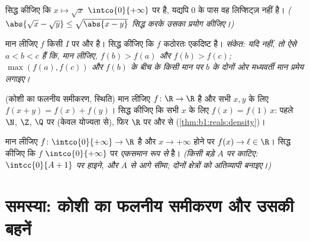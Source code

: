 \begin{exercise}[$\star\star$]\label{exo:b1:continuity:9}
सिद्ध कीजिए कि $x \mapsto \sqrt x$ $\intco{0}{+\infty}$ पर  है, यद्यपि $0$ के पास वह लिप्शिट्ज़ नहीं है। \emph{($\abs{\sqrt x -
\sqrt y} \leq \sqrt{\abs{x - y}}$ सिद्ध करके उसका प्रयोग कीजिए।)}
\end{exercise}

\begin{exercise}[$\star\star\star$]\label{exo:b1:continuity:10}
मान लीजिए $f$ किसी  $I$ पर  और  है। सिद्ध कीजिए कि $f$ कठोरतः
एकदिष्ट है। \emph{संकेत: यदि नहीं, तो ऐसे $a < b < c$ हैं कि, मान लीजिए,
$f(b) > f(a)$ और $f(b) > f(c)$; $\max(f(a), f(c))$ और $f(b)$ के बीच के किसी
मान पर $b$ के दोनों ओर मध्यवर्ती मान प्रमेय लगाइए।}
\end{exercise}

\begin{exercise}[$\star\star\star$]\label{exo:b1:continuity:11}
(कोशी का फलनीय समीकरण,  स्थिति) मान लीजिए $f \colon \R \to \R$  है
और सभी $x, y$ के लिए $f(x + y) = f(x) + f(y)$। सिद्ध कीजिए कि सभी $x$ के लिए
$f(x) = f(1)\,x$: पहले $\N$, $\Z$, $\Q$ पर (केवल योज्यता से), फिर $\R$ पर
 और  से (\cref{thm:b1:reals:density})।
\end{exercise}

\begin{exercise}[$\star\star\star$]\label{exo:b1:continuity:12}
मान लीजिए $f \colon \intco{0}{+\infty} \to \R$  है और $x \to +\infty$
होने पर $f(x) \to \ell \in \R$। सिद्ध कीजिए कि $f$ $\intco{0}{+\infty}$ पर
\emph{एकसमान रूप से}  है। \emph{(किसी बड़े $A$ पर काटिए:
$\intcc{0}{A+1}$ पर हाइने, और $A$ से आगे सीमा; दोनों क्षेत्रों को अतिव्यापी
बनाइए।)}
\end{exercise}

\section{समस्या: कोशी का फलनीय समीकरण और उसकी बहनें}

